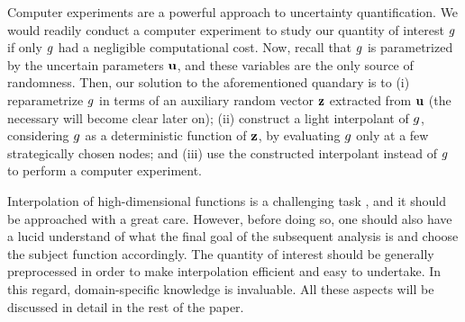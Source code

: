 Computer experiments \cite{santner2003} are a powerful approach to uncertainty
quantification. We would readily conduct a computer experiment to study our
quantity of interest $g$ if only $g$ had a negligible computational cost. Now,
recall that $g$ is parametrized by the uncertain parameters $\mathbf{u}$, and these
variables are the only source of randomness. Then, our solution to the
aforementioned quandary is to (i) reparametrize $g$ in terms of an auxiliary
random vector $\mathbf{z}$ extracted from $\mathbf{u}$ (the necessary will become clear later
on); (ii) construct a light interpolant of $g$, considering $g$ as a
deterministic function of $\mathbf{z}$, by evaluating $g$ only at a few strategically
chosen nodes; and (iii) use the constructed interpolant instead of $g$ to
perform a computer experiment.

Interpolation of high-dimensional functions is a challenging task \perse, and it
should be approached with a great care. However, before doing so, one should
also have a lucid understand of what the final goal of the subsequent analysis
is and choose the subject function accordingly. The quantity of interest should
be generally preprocessed in order to make interpolation efficient and easy to
undertake. In this regard, domain-specific knowledge is invaluable. All these
aspects will be discussed in detail in the rest of the paper.
